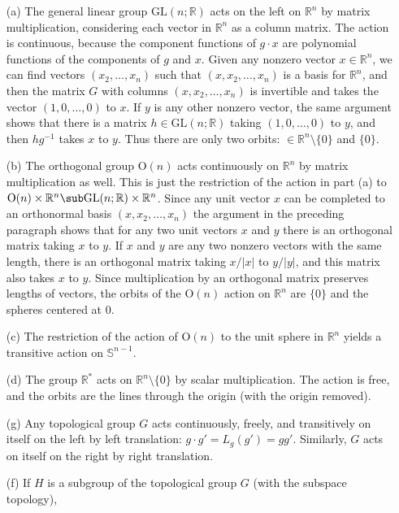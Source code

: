 \begin{example}\label{group action eg}
\mbox{}
\begin{itemize}
\item[(a)] The general linear group $\mathrm{GL}(n;\mathbb{R})$ acts on the left on $\mathbb{R}^n$ by matrix multiplication, considering each vector in $\mathbb{R}^n$ as a column matrix. The action is continuous, because the component functions of $g\cdot x$ are polynomial functions of the components of $g$ and $x$. Given any nonzero vector $x\in\mathbb{R}^n$, we can find vectors $(x_2,\dots,x_n)$ such that $(x,x_2,\dots,x_n)$ is a basis for $\mathbb{R}^n$, and then the matrix $G$ with columns $(x,x_2,\dots,x_n)$ is invertible and takes the vector $(1,0,\dots,0)$ to $x$. If $y$ is any other nonzero vector, the same argument shows that there is a matrix $h\in\mathrm{GL}(n;\mathbb{R})$ taking $(1,0,\dots,0)$ to $y$, and then $hg^{-1}$ takes $x$ to $y$. Thus there are only two orbits: $\in\mathbb{R}^n\setminus\{0\}$ and $\{0\}$.
\item[(b)] The orthogonal group $\mathrm{O}(n)$ acts continuously on $\mathbb{R}^n$ by matrix multiplication as well. This is just the restriction of the action in part (a) to $\mathrm{O}(n)\times\mathbb{R}^n\sub \mathrm{GL}(n;\mathbb{R})\times\mathbb{R}^n$. Since any unit vector $x$ can be completed to an orthonormal basis $(x,x_2,\dots,x_n)$ the argument in the preceding paragraph shows that for any two unit vectors $x$ and $y$ there is an orthogonal matrix taking $x$ to $y$. If $x$ and $y$ are any two nonzero vectors with the same length, there is an orthogonal matrix taking $x/|x|$ to $y/|y|$, and this matrix also takes $x$ to $y$. Since multiplication by an orthogonal matrix preserves lengths of vectors, the orbits of the $\mathrm{O}(n)$ action on $\mathbb{R}^n$ are $\{0\}$ and the spheres centered at $0$.
\item[(c)] The restriction of the action of $\mathrm{O}(n)$ to the unit sphere in $\mathbb{R}^n$ yields a transitive
action on $\mathbb{S}^{n-1}$.
\item[(d)] The group $\mathbb{R}^*$ acts on $\mathbb{R}^n\setminus\{0\}$  by scalar multiplication. The action is free, and the orbits are the lines through the origin (with the origin removed).
\item[(g)] Any topological group $G$ acts continuously, freely, and transitively on itself on
the left by left translation: $g\cdot g'=L_g(g')=gg'$. Similarly, $G$ acts on itself on the right by right translation.
\item[(f)] If $H$ is a subgroup of the topological group $G$ (with the subspace topology),

\end{itemize}
\end{example}
